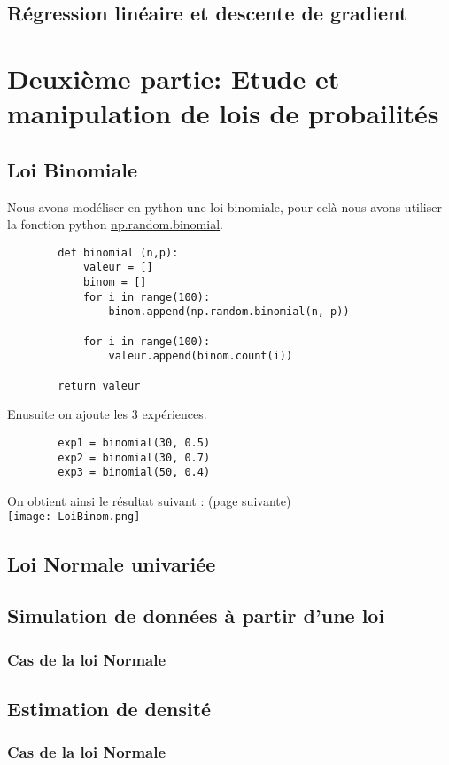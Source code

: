 \documentclass{article}
\begin{document}
    \subsection{Régression linéaire et descente de gradient}
    \newpage
    \section{Deuxième partie: Etude et manipulation de lois de probailités}
    \subsection{Loi Binomiale}
    Nous avons modéliser en python une loi binomiale, pour celà nous avons utiliser la fonction python \href{https://koor.fr/Python/API/scientist/numpy.random/binomial.wp}{np.random.binomial}.
    \begin{lstlisting}
        def binomial (n,p):
            valeur = []
            binom = []
            for i in range(100):
                binom.append(np.random.binomial(n, p))

            for i in range(100):
                valeur.append(binom.count(i))
    
        return valeur
    \end{lstlisting}
    Enusuite on ajoute les 3 expériences.
    \begin{lstlisting}
        exp1 = binomial(30, 0.5)
        exp2 = binomial(30, 0.7)
        exp3 = binomial(50, 0.4)
    \end{lstlisting}
    On obtient ainsi le résultat suivant : (page suivante)\\
    \texttt{[image: LoiBinom.png]}
    \newpage
    \subsection{Loi Normale univariée}
    \subsection{Simulation de données à partir d'une loi}
    \subsubsection{Cas de la loi Normale}
    \subsection{Estimation de densité}
    \subsubsection{Cas de la loi Normale}
\end{document}
